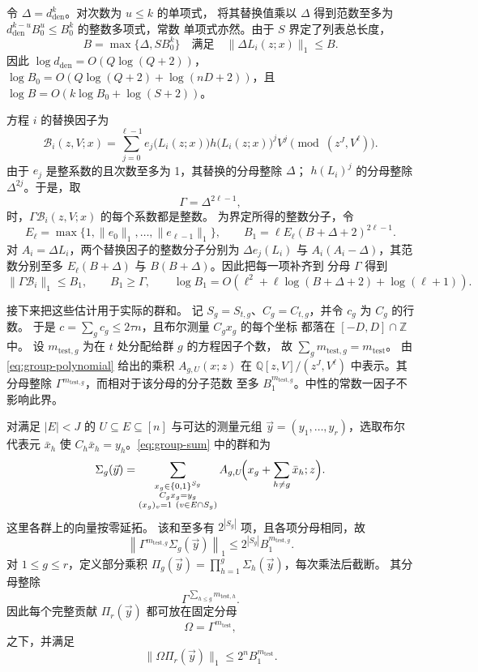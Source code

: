 \documentclass[11pt,reqno]{amsart}
\numberwithin{equation}{section}
\theoremstyle{definition}\newtheorem{definition}[theorem]{定义}
\theoremstyle{remark}\newtheorem{remark}[theorem]{注}
\renewcommand{\le}{\leqslant}
\renewcommand{\ge}{\geqslant}
\begin{document}
令 $\Delta=d_{\mathrm{den}}^k$。对次数为 $u\le k$ 的单项式，
将其替换值乘以 $\Delta$ 得到范数至多为
$d_{\mathrm{den}}^{k-u}B_0^u\le B_0^k$ 的整数多项式，常数
单项式亦然。由于 $S$ 界定了列表总长度，
\[
 B=\max\{\Delta,SB_0^k\}
 \quad\text{满足}\quad \|\Delta L_i(z;x)\|_1\le B .
\]
因此 $\log d_{\mathrm{den}}=O(Q\log(Q+2))$，
$\log B_0=O(Q\log(Q+2)+\log(nD+2))$，且
$\log B=O(k\log B_0+\log(S+2))$。

方程 $i$ 的替换因子为
\[
 \mathcal B_i(z,V;x)=\sum_{j=0}^{\ell-1}
       e_j\bigl(L_i(z;x)\bigr)h\bigl(L_i(z;x)\bigr)^jV^j
       \pmod{(z^J,V^\ell)}.
\]
由于 $e_j$ 是整系数的且次数至多为 1，其替换的分母整除 $\Delta$；
$h(L_i)^j$ 的分母整除 $\Delta^{2j}$。于是，取
\[
 \Gamma=\Delta^{2\ell-1},
\]
时，$\Gamma\mathcal B_i(z,V;x)$ 的每个系数都是整数。
为界定所得的整数分子，令
\[
 E_\ell=\max\{1,\|e_0\|_1,\ldots,\|e_{\ell-1}\|_1\},\qquad
 B_1=\ell E_\ell(B+\Delta+2)^{2\ell-1}.
\]
对 $A_i=\Delta L_i$，两个替换因子的整数分子分别为
$\Delta e_j(L_i)$ 与 $A_i(A_i-\Delta)$，其范数分别至多
$E_\ell(B+\Delta)$ 与 $B(B+\Delta)$。因此把每一项补齐到
分母 $\Gamma$ 得到
\[
 \|\Gamma\mathcal B_i\|_1\le B_1,\qquad B_1\ge\Gamma,
 \qquad
 \log B_1=O\!\left(\ell^2+
       \ell\log(B+\Delta+2)+\log(\ell+1)\right).
\]

接下来把这些估计用于实际的群和。
记 $S_g=S_{t,g}$、$C_g=C_{t,g}$，并令 $c_g$ 为 $C_g$ 的行数。
于是 $c=\sum_g c_g\le2\tau n$，且布尔测量 $C_gx_g$ 的每个坐标
都落在 $[-D,D]\cap\mathbb Z$ 中。
设 $m_{\mathrm{test},g}$ 为在 $t$ 处分配给群 $g$ 的方程因子个数，
故 $\sum_g m_{\mathrm{test},g}=m_{\mathrm{test}}$。
由 \eqref{eq:group-polynomial} 给出的乘积 $A_{g,U}(x;z)$ 在
$\mathbb Q[z,V]/(z^J,V^\ell)$ 中表示。其分母整除
$\Gamma^{m_{\mathrm{test},g}}$，而相对于该分母的分子范数
至多 $B_1^{m_{\mathrm{test},g}}$。中性的常数一因子不影响此界。

对满足 $|E|<J$ 的 $U\subseteq E\subseteq[n]$ 与可达的测量元组
$\vec y=(y_1,\ldots,y_r)$，选取布尔代表元
$\bar x_h$ 使 $C_h\bar x_h=y_h$。\eqref{eq:group-sum} 中的群和为
\[
 \Sigma_g(\vec y)=
 \sum_{\substack{x_g\in\{0,1\}^{S_g}\\ C_gx_g=y_g\\
                  (x_g)_v=1\ (v\in E\cap S_g)}}
 A_{g,U}\!\Bigl(x_g+\sum_{h\ne g}\bar x_h;z\Bigr).
\]
这里各群上的向量按零延拓。
该和至多有 $2^{|S_g|}$ 项，且各项分母相同，故
\[
 \left\|\Gamma^{m_{\mathrm{test},g}}\Sigma_g(\vec y)\right\|_1
 \le 2^{|S_g|}B_1^{m_{\mathrm{test},g}}.
\]
对 $1\le g\le r$，定义部分乘积
$\Pi_g(\vec y)=\prod_{h=1}^g\Sigma_h(\vec y)$，每次乘法后截断。
其分母整除
\[
 \Gamma^{\sum_{h\le g}m_{\mathrm{test},h}}.
\]
因此每个完整贡献 $\Pi_r(\vec y)$ 都可放在固定分母
\[
 \Omega=\Gamma^{m_{\mathrm{test}}},
\]
之下，并满足
\[
 \|\Omega\Pi_r(\vec y)\|_1
 \le2^nB_1^{m_{\mathrm{test}}}.
\]
\end{document}
